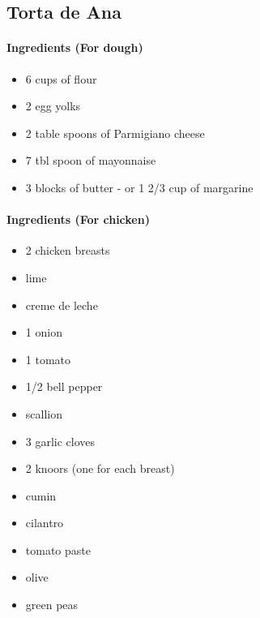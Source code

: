 \documentclass{article}
\begin{document}
\subsection{Torta de Ana}

\paragraph{Ingredients (For dough)}

\begin{itemize}
	\item 6 cups of flour
	\item 2 egg yolks
	\item 2 table spoons of Parmigiano cheese
	\item 7 tbl spoon of mayonnaise
	\item 3 blocks of butter - or 1 2/3 cup of margarine
\end{itemize}

\paragraph{Ingredients (For chicken)}

\begin{itemize}
	\item 2 chicken breasts
	\item lime
	\item creme de leche
	\item 1 onion
	\item 1 tomato
	\item 1/2 bell pepper
	\item scallion
	\item 3 garlic cloves
	\item 2 knoors (one for each breast)
	\item cumin
	\item cilantro
	\item tomato paste
	\item olive
	\item green peas
\end{itemize}
\end{document}
